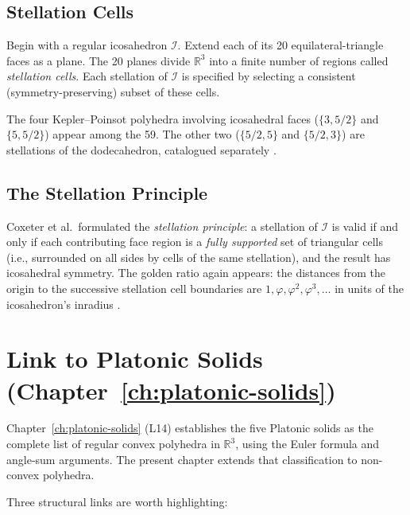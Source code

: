 \subsection{Stellation Cells}
\label{ssec:stellation-cells}

Begin with a regular icosahedron $\mathcal{I}$.  Extend each
of its 20 equilateral-triangle faces as a plane.  The 20
planes divide $\mathbb{R}^3$ into a finite number of regions
called \emph{stellation cells}.  Each stellation of
$\mathcal{I}$ is specified by selecting a consistent
(symmetry-preserving) subset of these cells.

The four Kepler–Poinsot polyhedra involving icosahedral faces
($\{3,5/2\}$ and $\{5,5/2\}$) appear among the 59.  The other
two ($\{5/2,5\}$ and $\{5/2,3\}$) are stellations of the
dodecahedron, catalogued separately \cite{coxeter_fifty_nine_icosahedra}.

\subsection{The Stellation Principle}
\label{ssec:stellation-principle}

Coxeter et al.\ formulated the \emph{stellation principle}:
a stellation of $\mathcal{I}$ is valid if and only if each
contributing face region is a \emph{fully supported} set of
triangular cells (i.e., surrounded on all sides by cells of the
same stellation), and the result has icosahedral symmetry.  The
golden ratio again appears: the distances from the origin to
the successive stellation cell boundaries are
$1, \varphi, \varphi^2, \varphi^3, \ldots$ in units of the
icosahedron's inradius \cite{coxeter_fifty_nine_icosahedra}.

\section{Link to Platonic Solids (Chapter~\ref{ch:platonic-solids})}
\label{sec:link-platonic}

Chapter~\ref{ch:platonic-solids} (L14) establishes the five Platonic
solids as the complete list of regular convex polyhedra in
$\mathbb{R}^3$, using the Euler formula and angle-sum arguments.
The present chapter extends that classification to
non-convex polyhedra.

Three structural links are worth highlighting:

